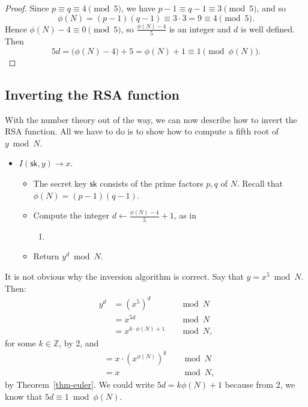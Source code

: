 \documentclass[
  letterpaper,
]{scrbook}
\providecommand{\tightlist}{%
  \setlength{\itemsep}{0pt}\setlength{\parskip}{0pt}}
\newcommand{\Z}{\mathbb{Z}}
\newcommand{\sk}{\mathsf{sk}}
\theoremstyle{definition}
\theoremstyle{plain}
\theoremstyle{plain}
\theoremstyle{remark}
\begin{document}
\begin{proof}
Since \(p \equiv q \equiv 4 \pmod 5\), we have
\(p - 1 \equiv q - 1 \equiv
3 \pmod 5\), and so
\[ \phi(N) = (p-1)(q-1) \equiv 3 \cdot 3 = 9 \equiv 4 \pmod 5. \] Hence
\(\phi(N) - 4 \equiv 0 \pmod 5\), so \(\frac{\phi(N)-4}{5}\) is an
integer and \(d\) is well defined. Then
\[ 5d = \big(\phi(N) - 4\big) + 5 = \phi(N) + 1 \equiv 1 \pmod{\phi(N)}. \]
\end{proof}

\subsection{Inverting the RSA
function}\label{inverting-the-rsa-function}

With the number theory out of the way, we can now describe how to invert
the RSA function. All we have to do is to show how to compute a fifth
root of \(y \bmod N\).

\begin{itemize}
\tightlist
\item
  \(I(\sk, y) \to x\).

  \begin{itemize}
  \tightlist
  \item
    The secret key \(\sk\) consists of the prime factors \(p,q\) of
    \(N\). Recall that \(\phi(N) = (p-1)(q-1)\).
  \item
    Compute the integer \(d \gets \frac{\phi(N) - 4}{5} + 1\), as in

    \begin{enumerate}
    \def\labelenumi{\arabic{enumi}.}
    \setcounter{enumi}{1}
    \tightlist
    \item
    \end{enumerate}

  \item
    Return \(y^d \bmod N\).
  \end{itemize}
\end{itemize}

It is not obvious why the inversion algorithm is correct. Say that
\(y = x^5 \bmod N\). Then: \[\begin{aligned}
  y^d &= (x^5)^d &&\bmod N\\
      &= x^{5d} &&\bmod N\\
      &= x^{k \cdot \phi(N) + 1} &&\bmod N,
\end{aligned}\] for some \(k \in \Z\), by 2, and \[\begin{aligned}
      &= x \cdot (x^{\phi(N)})^k &&\bmod N\\
      &= x &&\bmod N,
\end{aligned}\] by Theorem~\ref{thm-euler}. We could write
\(5d = k \phi(N) + 1\) because from 2, we know that
\(5d \equiv 1 \bmod \phi(N)\).
\end{document}

